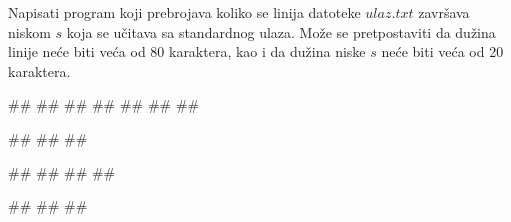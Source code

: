 \begin{Exercise}[label=p3_04] 
 Napisati program koji prebrojava koliko se linija datoteke $ulaz.txt$ završava niskom $s$ koja se učitava sa standardnog ulaza. Može se pretpostaviti da dužina linije neće biti veća od 80 karaktera, kao i da dužina niske $s$ neće biti veća od 20 karaktera.\\
\begin{miditest}
\begin{upotreba}{1}
##
##
##
##
##
##
##

#\naslovInt#
##
##
\end{upotreba}
\end{miditest}
\begin{miditest}
\begin{upotreba}{2}
##
##
##
##

#\naslovInt#
##
##
\end{upotreba}
\end{miditest}
\end{Exercise}
\begin{Answer}[ref=p3_04]
\end{Answer}

